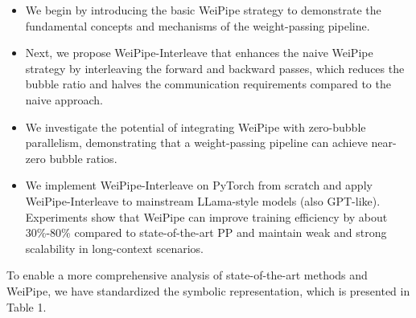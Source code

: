 \documentclass[sigplan,screen]{acmart}
\begin{document}
\begin{itemize}
    \item We begin by introducing the basic WeiPipe strategy to demonstrate the fundamental concepts and mechanisms of the weight-passing pipeline.
    \item Next, we propose WeiPipe-Interleave that enhances the naive WeiPipe strategy by interleaving the forward and backward passes, which reduces the bubble ratio and halves the communication requirements compared to the naive approach.
    \item We investigate the potential of integrating WeiPipe with zero-bubble parallelism, demonstrating that a weight-passing pipeline can achieve near-zero bubble ratios.
    \item We implement WeiPipe-Interleave on PyTorch from scratch and apply WeiPipe-Interleave to mainstream LLama-style\cite{touvron2023llama2openfoundation} models (also GPT-like). Experiments show that WeiPipe can improve training efficiency by about 30\%-80\% compared to state-of-the-art PP and maintain weak and strong scalability in long-context scenarios.
\end{itemize}


To enable a more comprehensive analysis of state-of-the-art methods and WeiPipe, we have standardized the symbolic representation, which is presented in Table 1. 
\end{document}
